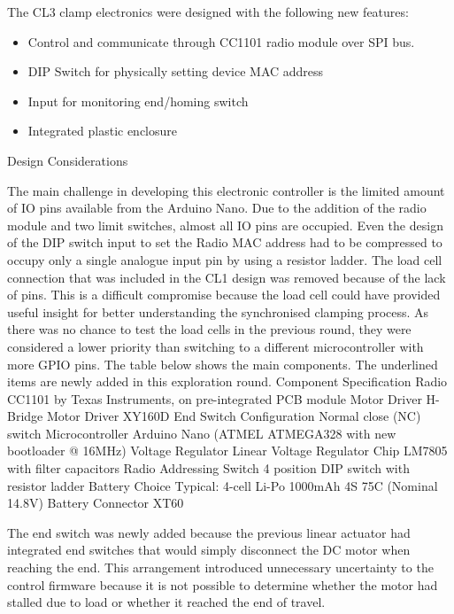 The CL3 clamp electronics were designed with the following new features:
\begin{itemize}
    \item Control and communicate through CC1101 radio module over SPI bus. 
    \item DIP Switch for physically setting device MAC address
    \item Input for monitoring end/homing switch
    \item Integrated plastic enclosure
\end{itemize}

Design Considerations

The main challenge in developing this electronic controller is the limited amount of IO pins available from the Arduino Nano. Due to the addition of the radio module and two limit switches, almost all IO pins are occupied. Even the design of the DIP switch input to set the Radio MAC address had to be compressed to occupy only a single analogue input pin by using a resistor ladder. \parencite{chrisPerfectMultibuttonInput2018}
The load cell connection that was included in the CL1 design was removed because of the lack of pins. This is a difficult compromise because the load cell could have provided useful insight for better understanding the synchronised clamping process. As there was no chance to test the load cells in the previous round, they were considered a lower priority than switching to a different microcontroller with more GPIO pins.  
The table below shows the main components. The underlined items are newly added in this exploration round. 
Component
Specification
Radio
CC1101 by Texas Instruments, on pre-integrated PCB module
Motor Driver
H-Bridge Motor Driver XY160D
End Switch Configuration
Normal close (NC) switch
Microcontroller
Arduino Nano (ATMEL ATMEGA328 with new bootloader @ 16MHz)
Voltage Regulator
 Linear Voltage Regulator Chip LM7805 with filter capacitors
Radio Addressing Switch
 4 position DIP switch with resistor ladder
Battery Choice
Typical: 4-cell Li-Po 1000mAh 4S 75C (Nominal 14.8V)
Battery Connector
XT60 


The end switch was newly added because the previous linear actuator had integrated end switches that would simply disconnect the DC motor when reaching the end. This arrangement introduced unnecessary uncertainty to the control firmware because it is not possible to determine whether the motor had stalled due to load or whether it reached the end of travel.

